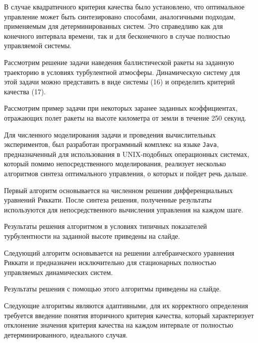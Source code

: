 \documentclass[12pt,a4paper,legalpaper,pdftex]{letter}
\begin{document}
В случае квадратичного критерия качества было установлено, что оптимальное управление может быть синтезировано способами, аналогичными подходам, применяемым для детерминированных систем. Это справедливо как для конечного интервала времени, так и для бесконечного в случае полностью управляемой системы.



Рассмотрим решение задачи наведения баллистической ракеты на заданную траекторию в условиях турбулентной атмосферы. Динамическую систему для этой задачи можно представить в виде системы (16) и определить критерий качества (17).



Рассмотрим пример задачи при некоторых заранее заданных коэффициентах, отражающих полет ракеты на высоте километра от земли в течение 250 секунд.



Для численного моделирования задачи и проведения вычислительных экспериментов, был разработан программный комплекс на языке \texttt{Java}, предназначенный для использования в UNIX-подобных операционных системах, который помимо непосредственного моделирования, реализует несколько алгоритмов синтеза оптимального управления, о которых и пойдет речь дальше.



Первый алгоритм основывается на численном решении дифференциальных уравнений Риккати. После синтеза решения, полученные результаты используются для непосредственного вычисления управления на каждом шаге.



Результаты решения алгоритмом в условиях типичных показателей турбулентности на заданной высоте приведены на слайде.



Следующий алгоритм основывается на решении алгебраического уравнения Риккати и предназначен исключительно для стационарных полностью управляемых динамических систем.



Результаты решения с помощью этого алгоритмы приведены на слайде.



Следующие алгоритмы являются адаптивными, для их корректного определения требуется введение понятия вторичного критерия качества, который характеризует отклонение значения критерия качества на каждом интервале от полностью детерминированного, идеального случая.
\end{document}
